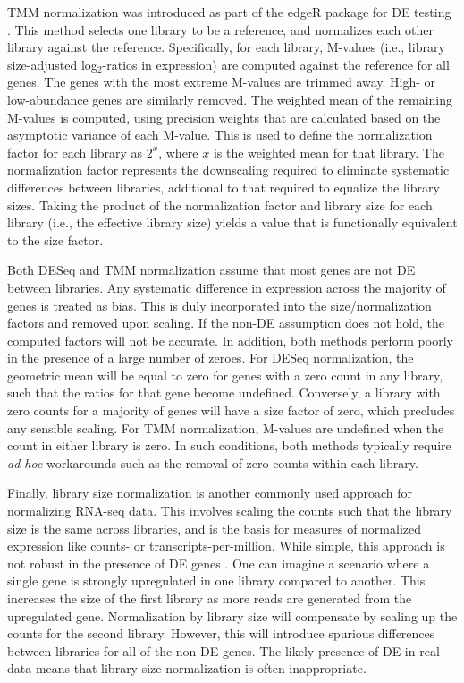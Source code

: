 \documentclass{article}
\begin{document}
TMM normalization was introduced as part of the edgeR package for DE testing \cite{robinson2010edgeR}.
This method selects one library to be a reference, and normalizes each other library against the reference.
Specifically, for each library, M-values (i.e., library size-adjusted log$_2$-ratios in expression) are computed against the reference for all genes.
The genes with the most extreme M-values are trimmed away.
High- or low-abundance genes are similarly removed.
The weighted mean of the remaining M-values is computed, using precision weights that are calculated based on the asymptotic variance of each M-value.
This is used to define the normalization factor for each library as $2^x$, where $x$ is the weighted mean for that library.
The normalization factor represents the downscaling required to eliminate systematic differences between libraries, additional to that required to equalize the library sizes.
Taking the product of the normalization factor and library size for each library (i.e., the effective library size) yields a value that is functionally equivalent to the size factor.

Both DESeq and TMM normalization assume that most genes are not DE between libraries.
Any systematic difference in expression across the majority of genes is treated as bias.
This is duly incorporated into the size/normalization factors and removed upon scaling.
If the non-DE assumption does not hold, the computed factors will not be accurate.
In addition, both methods perform poorly in the presence of a large number of zeroes.
For DESeq normalization, the geometric mean will be equal to zero for genes with a zero count in any library, such that the ratios for that gene become undefined.
Conversely, a library with zero counts for a majority of genes will have a size factor of zero, which precludes any sensible scaling.
For TMM normalization, M-values are undefined when the count in either library is zero.
In such conditions, both methods typically require \textit{ad hoc} workarounds such as the removal of zero counts within each library.

Finally, library size normalization is another commonly used approach for normalizing RNA-seq data.
This involves scaling the counts such that the library size is the same across libraries,
    and is the basis for measures of normalized expression like counts- or transcripts-per-million.
While simple, this approach is not robust in the presence of DE genes \cite{robinson2010scaling}.
One can imagine a scenario where a single gene is strongly upregulated in one library compared to another.
This increases the size of the first library as more reads are generated from the upregulated gene.
Normalization by library size will compensate by scaling up the counts for the second library.
However, this will introduce spurious differences between libraries for all of the non-DE genes.
The likely presence of DE in real data means that library size normalization is often inappropriate.
\end{document}
